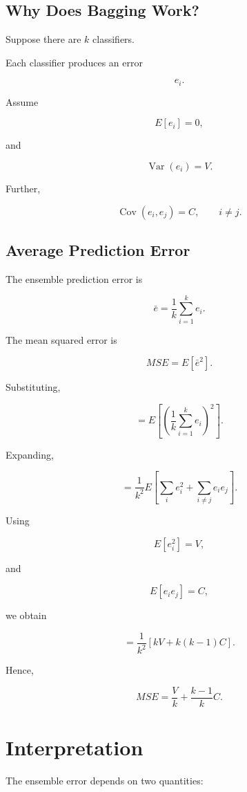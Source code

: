 \documentclass[11pt]{article}
\begin{document}
\subsection{Why Does Bagging Work?}

Suppose there are $k$ classifiers.

Each classifier produces an error

\[
e_i.
\]

Assume

\[
E[e_i]=0,
\]

and

\[
\operatorname{Var}(e_i)=V.
\]

Further,

\[
\operatorname{Cov}(e_i,e_j)=C,
\qquad i\neq j.
\]

\subsection{Average Prediction Error}

The ensemble prediction error is

\[
\bar e
=
\frac1k
\sum_{i=1}^{k}
e_i.
\]

The mean squared error is

\[
MSE
=
E[\bar e^2].
\]

Substituting,

\[
=
E
\left[
\left(
\frac1k
\sum_{i=1}^{k}
e_i
\right)^2
\right].
\]

Expanding,

\[
=
\frac1{k^2}
E
\left[
\sum_i e_i^2
+
\sum_{i\neq j}
e_ie_j
\right].
\]

Using

\[
E[e_i^2]=V,
\]

and

\[
E[e_ie_j]=C,
\]

we obtain

\[
=
\frac1{k^2}
\left[
kV
+
k(k-1)C
\right].
\]

Hence,

\[
\boxed{
	MSE
	=
	\frac{V}{k}
	+
	\frac{k-1}{k}C.
}
\]

\section{Interpretation}

The ensemble error depends on two quantities:
\end{document}
